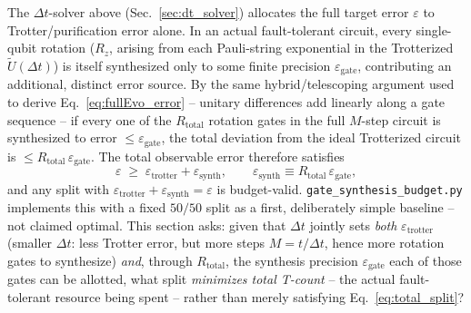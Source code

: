 \documentclass[11pt]{article}
\newcommand{\Dt}{\Delta t}
\begin{document}
The $\Dt$-solver above (Sec.~\ref{sec:dt_solver}) allocates the full target error $\varepsilon$ to Trotter/purification error alone. In an actual fault-tolerant circuit, every single-qubit rotation ($R_z$, arising from each Pauli-string exponential in the Trotterized $\tilde{U}(\Dt)$) is itself synthesized only to some finite precision $\varepsilon_{\text{gate}}$, contributing an additional, distinct error source. By the same hybrid/telescoping argument used to derive Eq.~\eqref{eq:fullEvo_error} -- unitary differences add linearly along a gate sequence -- if every one of the $R_{\text{total}}$ rotation gates in the full $M$-step circuit is synthesized to error $\le\varepsilon_{\text{gate}}$, the total deviation from the ideal Trotterized circuit is $\le R_{\text{total}}\,\varepsilon_{\text{gate}}$. The total observable error therefore satisfies
\begin{equation}\label{eq:total_split}
    \varepsilon \;\ge\; \varepsilon_{\text{trotter}} + \varepsilon_{\text{synth}}, \qquad \varepsilon_{\text{synth}} \equiv R_{\text{total}}\,\varepsilon_{\text{gate}},
\end{equation}
and any split with $\varepsilon_{\text{trotter}}+\varepsilon_{\text{synth}}=\varepsilon$ is budget-valid. \texttt{gate\_synthesis\_budget.py} implements this with a fixed $50/50$ split as a first, deliberately simple baseline -- not claimed optimal. This section asks: given that $\Dt$ jointly sets \emph{both} $\varepsilon_{\text{trotter}}$ (smaller $\Dt$: less Trotter error, but more steps $M=t/\Dt$, hence more rotation gates to synthesize) \emph{and}, through $R_{\text{total}}$, the synthesis precision $\varepsilon_{\text{gate}}$ each of those gates can be allotted, what split \emph{minimizes total T-count} -- the actual fault-tolerant resource being spent -- rather than merely satisfying Eq.~\eqref{eq:total_split}?
\end{document}
